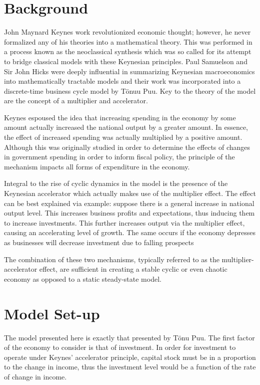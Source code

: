 \section{Background}
John Maynard Keynes work revolutionized economic thought; however, he never formalized any of his theories into a mathematical theory. This was performed in a process known as the neoclassical synthesis which was so called for its attempt to bridge classical models with these Keynesian principles. Paul Samuelson and Sir John Hicks were deeply influential in summarizing Keynesian macroeconomics into mathematically tractable models and their work was incorporated into a discrete-time business cycle model by T\"{o}nuu Puu\autocite{Puu2003}. Key to the theory of the model are the concept of a multiplier and accelerator.

Keynes espoused the idea that increasing spending in the economy by some amount actually increased the national output by a greater amount. In essence, the effect of increased spending was actually multiplied by a positive amount. Although this was originally studied in order to determine the effects of changes in government spending in order to inform fiscal policy\autocite{Samuelson1939}, the principle of the mechanism impacts all forms of expenditure in the economy. 

Integral to the rise of cyclic dynamics in the model is the presence of the Keynesian accelerator which actually makes use of the multiplier effect. The effect can be best explained via example: suppose there is a general increase in national output level. This increases business profits and expectations, thus inducing them to increase investments. This further increases output via the multiplier effect, causing an accelerating level of growth. The same occurs if the economy depresses as businesses will decrease investment due to falling prospects\autocite{Jorgenson1963}

The combination of these two mechanisms, typically referred to as the multiplier-accelerator effect, are sufficient in creating a stable cyclic or even chaotic economy as opposed to a static steady-state model. 

\section{Model Set-up}
The model presented here is exactly that presented by T\"onu Puu\autocite{Puu2003}. The first factor of the economy to consider is that of investment. In order for investment to operate under Keynes' accelerator principle, capital stock must be in a proportion to the change in income, thus the investment level would be a function of the rate of change in income. 

